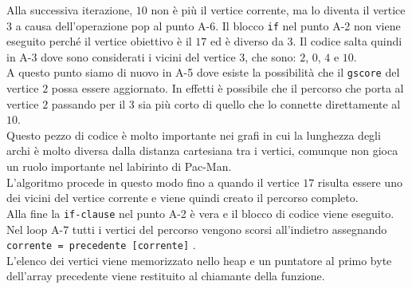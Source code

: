 \documentclass[8pt]{book}
\begin{document}
Alla successiva iterazione, $10$ non è più il vertice corrente, ma lo diventa il vertice $3$ a causa dell'operazione pop al punto A-6. Il blocco \texttt{if} nel punto A-2 non viene eseguito perché il vertice obiettivo è il $17$ ed è diverso da $3$. Il codice salta quindi in A-3 dove sono considerati i vicini del vertice $3$, che sono: $2$, $0$, $4$ e $10$.\\
A questo punto siamo di nuovo in A-5 dove esiste la possibilità che il \texttt{gscore} del vertice $2$ possa essere aggiornato. In effetti è possibile che il percorso che porta al vertice $2$ passando per il $3$ sia più corto di quello che lo connette direttamente al $10$.\\

Questo pezzo di codice è molto importante nei grafi in cui la lunghezza degli archi è molto diversa dalla distanza cartesiana tra i vertici, comunque non gioca un ruolo importante nel labirinto di Pac-Man.\\

L'algoritmo procede in questo modo fino a quando il vertice $17$ risulta essere uno dei vicini del vertice corrente e viene quindi creato il percorso completo.\\
Alla fine la \texttt{if-clause} nel punto A-2 è vera e il blocco di codice viene eseguito. Nel loop A-7 tutti i vertici del percorso vengono scorsi all'indietro assegnando \texttt{corrente = precedente {[}corrente{]}} .\\
L'elenco dei vertici viene memorizzato nello heap e un puntatore al primo byte dell'array precedente viene restituito al chiamante della funzione.
\end{document}
